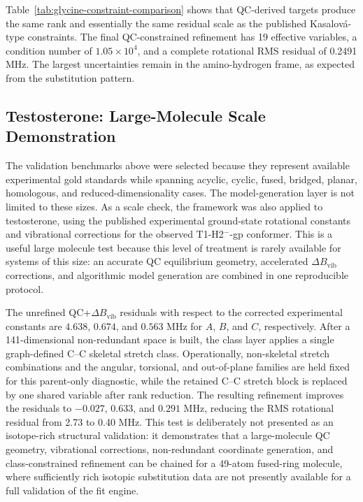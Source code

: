 \documentclass[aip,jcp,reprint,longbibliography,floatfix]{revtex4-2}
\begin{document}
Table~\ref{tab:glycine-constraint-comparison} shows that QC-derived targets
produce the same rank and essentially the same residual scale as the published
Kasalov{\'a}-type constraints. The final QC-constrained refinement has 19
effective variables, a condition number of $1.05\times10^4$, and a complete
rotational RMS residual of 0.2491 MHz. The largest uncertainties remain in the
amino-hydrogen frame, as expected from the substitution pattern.

\subsection{Testosterone: Large-Molecule Scale Demonstration}

The validation benchmarks above were selected because they represent available
experimental gold standards while spanning acyclic, cyclic, fused, bridged,
planar, homologous, and reduced-dimensionality cases. The model-generation
layer is not limited to these sizes. As a scale check, the framework was
also applied to testosterone, using the published experimental ground-state
rotational constants and vibrational corrections for the observed
T1-H2$^{-}$-gp conformer.\cite{Uribe2024SteroidHormones} This is a useful large
molecule test because this level of treatment is rarely available for systems
of this size: an accurate QC equilibrium geometry, accelerated
$\Delta B_\mathrm{vib}$ corrections, and algorithmic model generation are
combined in one reproducible protocol.

The unrefined QC+$\Delta B_\mathrm{vib}$ residuals with respect to the corrected
experimental constants are $4.638$, $0.674$, and $0.563$ MHz for $A$, $B$, and
$C$, respectively. After a 141-dimensional non-redundant space is built, the
class layer applies a single graph-defined C--C skeletal stretch class.
Operationally, non-skeletal stretch combinations and the angular, torsional,
and out-of-plane families are held fixed for this parent-only diagnostic, while
the retained C--C stretch block is replaced by one shared variable after rank
reduction. The resulting refinement improves the residuals to $-0.027$,
$0.633$, and $0.291$ MHz, reducing the RMS rotational residual from 2.73 to
0.40 MHz. This test is deliberately not presented as an isotope-rich structural
validation: it demonstrates that a large-molecule QC geometry, vibrational
corrections, non-redundant coordinate generation, and class-constrained
refinement can be chained for a 49-atom fused-ring molecule, where sufficiently
rich isotopic substitution data are not presently available for a full
validation of the fit engine.
\end{document}
